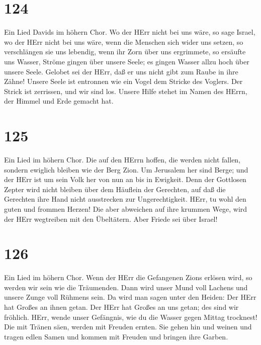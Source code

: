 \hypertarget{section-123}{%
\section{124}\label{section-123}}

 Ein Lied Davids im höhern Chor. Wo der HErr nicht bei uns
wäre, so sage Israel,  wo der HErr nicht bei uns wäre, wenn
die Menschen sich wider uns setzen,  so verschlängen sie uns
lebendig, wenn ihr Zorn über uns ergrimmete,  so ersäufte
uns Wasser, Ströme gingen über unsere Seele;  es gingen
Wasser allzu hoch über unsere Seele.  Gelobet sei der HErr,
daß er uns nicht gibt zum Raube in ihre Zähne!  Unsere Seele
ist entronnen wie ein Vogel dem Stricke des Voglers. Der Strick ist
zerrissen, und wir sind los.  Unsere Hilfe stehet im Namen
des HErrn, der Himmel und Erde gemacht hat.

\hypertarget{section-124}{%
\section{125}\label{section-124}}

 Ein Lied im höhern Chor. Die auf den HErrn hoffen, die
werden nicht fallen, sondern ewiglich bleiben wie der Berg Zion.
 Um Jerusalem her sind Berge; und der HErr ist um sein Volk
her von nun an bis in Ewigkeit.  Denn der Gottlosen Zepter
wird nicht bleiben über dem Häuflein der Gerechten, auf daß die
Gerechten ihre Hand nicht ausstrecken zur Ungerechtigkeit. 
HErr, tu wohl den guten und frommen Herzen!  Die aber
abweichen auf ihre krummen Wege, wird der HErr wegtreiben mit den
Übeltätern. Aber Friede sei über Israel!

\hypertarget{section-125}{%
\section{126}\label{section-125}}

 Ein Lied im höhern Chor. Wenn der HErr die Gefangenen Zions
erlösen wird, so werden wir sein wie die Träumenden.  Dann
wird unser Mund voll Lachens und unsere Zunge voll Rühmens sein. Da wird
man sagen unter den Heiden: Der HErr hat Großes an ihnen getan.
 Der HErr hat Großes an uns getan; des sind wir fröhlich.
 HErr, wende unser Gefängnis, wie du die Wasser gegen Mittag
trocknest!  Die mit Tränen säen, werden mit Freuden ernten.
 Sie gehen hin und weinen und tragen edlen Samen und kommen
mit Freuden und bringen ihre Garben.

